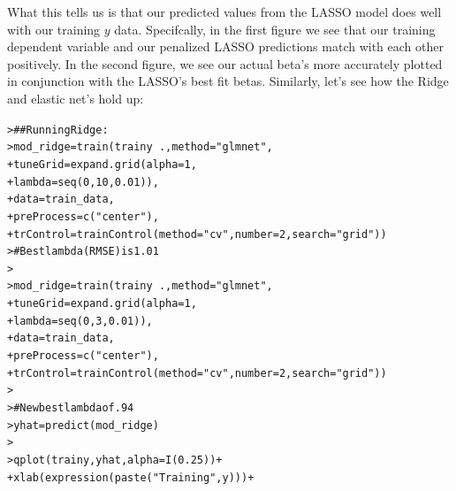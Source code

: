 \documentclass[12pt]{article}\usepackage[]{graphicx}\usepackage[]{color}
\makeatletter
\newcommand{\hlnum}[1]{\textcolor[rgb]{0.82,0.78,0.62}{#1}}%
\newcommand{\hlstr}[1]{\textcolor[rgb]{0.82,0.78,0.62}{#1}}%
\newcommand{\hlcom}[1]{\textcolor[rgb]{0.404,0.408,0.42}{#1}}%
\newcommand{\hlopt}[1]{\textcolor[rgb]{0.882,0.878,0.898}{#1}}%
\newcommand{\hlstd}[1]{\textcolor[rgb]{0.882,0.878,0.898}{#1}}%
\newcommand{\hlkwb}[1]{\textcolor[rgb]{0.902,0.675,0.196}{#1}}%
\newcommand{\hlkwc}[1]{\textcolor[rgb]{0.812,0.522,0.388}{#1}}%
\newcommand{\hlkwd}[1]{\textcolor[rgb]{0.733,0.388,0.812}{#1}}%
\newenvironment{kframe}{%
 \def\at@end@of@kframe{}%
 \ifinner\ifhmode%
  \def\at@end@of@kframe{\end{minipage}}%
  \begin{minipage}{\columnwidth}%
 \fi\fi%
 \def\FrameCommand##1{\hskip\@totalleftmargin \hskip-\fboxsep
 \colorbox{shadecolor}{##1}\hskip-\fboxsep
     \hskip-\linewidth \hskip-\@totalleftmargin \hskip\columnwidth}%
 \MakeFramed {\advance\hsize-\width
   \@totalleftmargin\z@ \linewidth\hsize
   \@setminipage}}%
 {\par\unskip\endMakeFramed%
 \at@end@of@kframe}
\newenvironment{knitrout}{}{} %
\makeatother
\begin{document}
\begin{flushleft}
What this tells us is that our predicted values from the LASSO model does well with our training $y$ data. Specifcally, in the first figure we see that our training dependent variable and our penalized LASSO predictions match with each other positively. In the second figure, we see our actual beta’s more accurately plotted in conjunction with the LASSO’s best fit betas.
Similarly, let’s see how the Ridge and elastic net’s hold up:

\begin{center}
\begin{knitrout}
\color{fgcolor}\begin{kframe}
\begin{alltt}
\hlstd{> }\hlcom{## Running Ridge:}
\hlstd{> }\hlstd{mod_ridge} \hlkwb{=} \hlkwd{train}\hlstd{(trainy}\hlopt{~}\hlstd{.,} \hlkwc{method}\hlstd{=}\hlstr{"glmnet"}\hlstd{,}
\hlstd{+ }          \hlkwc{tuneGrid}\hlstd{=}\hlkwd{expand.grid}\hlstd{(}\hlkwc{alpha}\hlstd{=}\hlnum{1}\hlstd{,}
\hlstd{+ }               \hlkwc{lambda}\hlstd{=}\hlkwd{seq}\hlstd{(}\hlnum{0}\hlstd{,}\hlnum{10}\hlstd{,}\hlnum{0.01}\hlstd{)),}
\hlstd{+ }          \hlkwc{data}\hlstd{=train_data,}
\hlstd{+ }          \hlkwc{preProcess}\hlstd{=}\hlkwd{c}\hlstd{(}\hlstr{"center"}\hlstd{),}
\hlstd{+ }          \hlkwc{trControl}\hlstd{=}\hlkwd{trainControl}\hlstd{(}\hlkwc{method}\hlstd{=}\hlstr{"cv"}\hlstd{,}\hlkwc{number}\hlstd{=}\hlnum{2}\hlstd{,} \hlkwc{search}\hlstd{=}\hlstr{"grid"}\hlstd{))}
\hlstd{> }\hlcom{# Best lambda (RMSE) is 1.01}
\hlstd{> }
\hlstd{> }\hlstd{mod_ridge} \hlkwb{=} \hlkwd{train}\hlstd{(trainy}\hlopt{~}\hlstd{.,} \hlkwc{method}\hlstd{=}\hlstr{"glmnet"}\hlstd{,}
\hlstd{+ }          \hlkwc{tuneGrid}\hlstd{=}\hlkwd{expand.grid}\hlstd{(}\hlkwc{alpha}\hlstd{=}\hlnum{1}\hlstd{,}
\hlstd{+ }               \hlkwc{lambda}\hlstd{=}\hlkwd{seq}\hlstd{(}\hlnum{0}\hlstd{,}\hlnum{3}\hlstd{,}\hlnum{0.01}\hlstd{)),}
\hlstd{+ }          \hlkwc{data}\hlstd{=train_data,}
\hlstd{+ }          \hlkwc{preProcess}\hlstd{=}\hlkwd{c}\hlstd{(}\hlstr{"center"}\hlstd{),}
\hlstd{+ }          \hlkwc{trControl}\hlstd{=}\hlkwd{trainControl}\hlstd{(}\hlkwc{method}\hlstd{=}\hlstr{"cv"}\hlstd{,}\hlkwc{number}\hlstd{=}\hlnum{2}\hlstd{,} \hlkwc{search}\hlstd{=}\hlstr{"grid"}\hlstd{))}
\hlstd{> }
\hlstd{> }\hlcom{# New best lambda of .94}
\hlstd{> }\hlstd{yhat} \hlkwb{=} \hlkwd{predict}\hlstd{(mod_ridge)}
\hlstd{> }
\hlstd{> }\hlkwd{qplot}\hlstd{(trainy, yhat,} \hlkwc{alpha}\hlstd{=}\hlkwd{I}\hlstd{(}\hlnum{0.25}\hlstd{))}\hlopt{+}
\hlstd{+ }     \hlkwd{xlab}\hlstd{(} \hlkwd{expression}\hlstd{(}\hlkwd{paste}\hlstd{(}\hlstr{"Training "}\hlstd{, y)))}\hlopt{+}

\end{alltt}
\end{kframe}
\end{knitrout}
\end{center}
\end{flushleft}
\end{document}
